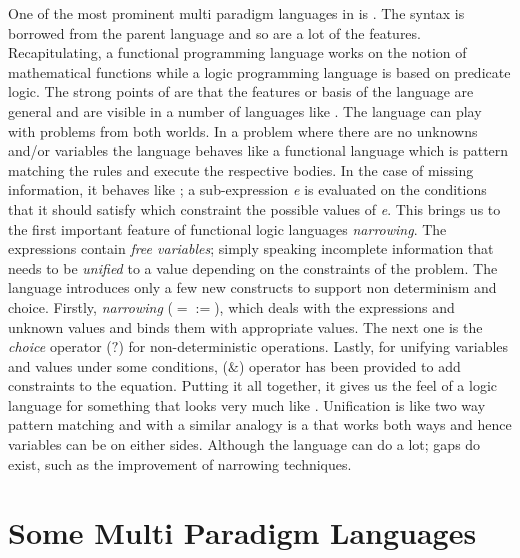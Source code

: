 \documentclass[thesis-solanki.tex]{subfiles}
\begin{document}
One of the most prominent multi paradigm languages in  is 
\cite{antoy2010functional}.
The syntax is borrowed from the parent language and so are a lot of the features.
Recapitulating, a functional programming language works on the notion of mathematical functions while a logic
programming language is based on predicate logic.
The strong points of  are that the features or basis of the language are general and are visible in
a number of languages like \cite{website:toy}.
The language can play with problems from both worlds.
In a problem where there are no unknowns and/or variables the language behaves like a functional language which is
pattern matching the rules and execute the respective bodies.
In the case of missing information, it behaves like ; a sub-expression \textit{e} is evaluated on
the conditions that it should satisfy which constraint the possible values of \textit{e}.
This brings us to the first important feature of functional logic languages \textit{narrowing}.
The expressions contain \textit{free variables}; simply speaking incomplete information that needs to be
\textit{unified} to a value depending on the constraints of the problem.
The language introduces only a few new constructs to support non determinism and choice.
Firstly, \textit{narrowing} ($\mathtt{=:=}$), which deals with the expressions and unknown values and binds them
with appropriate values.
The next one is the \textit{choice} operator ($\mathtt{?}$) for non-deterministic operations.
Lastly, for unifying variables and values under some conditions, ($\mathtt{\&}$) operator has been provided to add
constraints to the equation.
Putting it all together, it gives us the feel of a logic language for something that looks very much like
.
Unification is like two way pattern matching and with a similar analogy  is a 
that works both ways and hence variables can be on either sides.
Although the language can do a lot; gaps do exist, such as the improvement of narrowing techniques.
 
 

\section{Some Multi Paradigm Languages}
\end{document}
